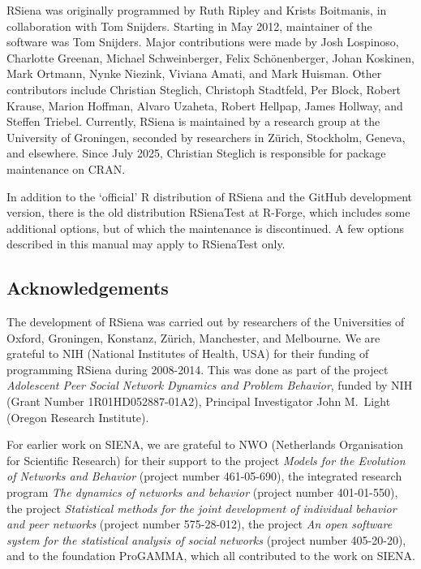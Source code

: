 \documentclass[a4paper,fleqn,11pt]{article}
\newcommand{\+}{\, + \,}
\newcommand{\sfn}[1]{\textsf{#1}}
\newcommand{\R}{{\sf R }}
\newcommand{\RS}{{\sf \textsf{RSiena} }}
\newcommand{\si}{{\sf SIENA}}
\begin{document}
\RS was originally programmed by Ruth Ripley and Krists Boitmanis,
in collaboration with Tom Snijders.
Starting in May 2012, maintainer of the software was Tom Snijders.
Major contributions were made by Josh Lospinoso, Charlotte Greenan,
Michael Schweinberger,
Felix Sch\"{o}nenberger, Johan Koskinen, Mark Ortmann, Nynke Niezink,
Viviana Amati, and Mark Huisman.
Other contributors include
Christian Steglich, Christoph Stadtfeld, Per Block,
Robert Krause, Marion Hoffman, Alvaro Uzaheta,
Robert Hellpap, James Hollway, and Steffen Triebel.
Currently, \RS is maintained by a research group
at the University of Groningen, seconded by researchers in Z\"{u}rich,
Stockholm, Geneva, and elsewhere.
Since July 2025, Christian Steglich is responsible for package
maintenance on CRAN.

In addition to the `official' \R distribution of \RS
and the \sfn{GitHub} development version, there is
the old distribution \sfn{RSienaTest} at \sfn{R-Forge},
which includes some additional options,
but of which the maintenance is discontinued.
A few options described in this manual may apply to
{\sf RSienaTest} only.

\subsection{Acknowledgements}

The development of \RS was carried out by researchers of the Universities
of Oxford, Groningen, Konstanz, Z\"{u}rich, Manchester, and Melbourne.
We are grateful to NIH (National Institutes of Health, USA)
for their funding of programming \RS during 2008-2014.
This was done
as part of the project \emph{Adolescent Peer Social Network Dynamics
and Problem Behavior}, funded by NIH (Grant Number 1R01HD052887-01A2),
Principal Investigator John M.\ Light (Oregon Research Institute).

For earlier work on \si, we are grateful to NWO (Netherlands Organisation for
Scientific Research) for their support to the project
\emph{Models for the Evolution of Networks and Behavior}
(project number 461-05-690),
the integrated research program
\emph{The dynamics of networks and behavior} (project number 401-01-550),
the project \emph{Statistical methods for the joint development of
individual behavior and peer networks} (project number 575-28-012),
the project \emph{An open software system for the statistical
analysis of social networks} (project number 405-20-20),
and to the foundation ProGAMMA,
which all contributed to the work on \si.
\end{document}
